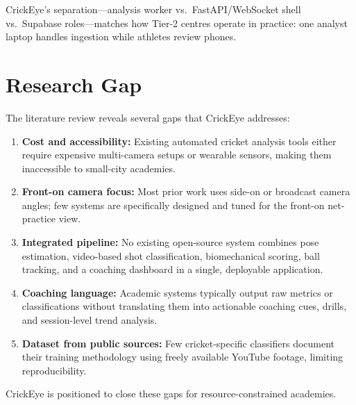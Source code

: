 \begin{justify}
\par CrickEye’s separation---analysis worker vs.\ FastAPI/WebSocket shell vs.\ Supabase roles---matches how Tier-2 centres operate in practice: one analyst laptop handles ingestion while athletes review phones.


\section{Research Gap}

\par The literature review reveals several gaps that CrickEye addresses:

\begin{enumerate}
    \item \textbf{Cost and accessibility:} Existing automated cricket analysis tools either require expensive multi-camera setups or wearable sensors, making them inaccessible to small-city academies.
    \item \textbf{Front-on camera focus:} Most prior work uses side-on or broadcast camera angles; few systems are specifically designed and tuned for the front-on net-practice view.
    \item \textbf{Integrated pipeline:} No existing open-source system combines pose estimation, video-based shot classification, biomechanical scoring, ball tracking, and a coaching dashboard in a single, deployable application.
    \item \textbf{Coaching language:} Academic systems typically output raw metrics or classifications without translating them into actionable coaching cues, drills, and session-level trend analysis.
    \item \textbf{Dataset from public sources:} Few cricket-specific classifiers document their training methodology using freely available YouTube footage, limiting reproducibility.
\end{enumerate}

\par CrickEye is positioned to close these gaps for resource-constrained academies.

\end{justify}